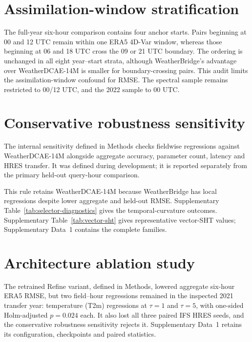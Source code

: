 \documentclass[referee,pdflatex,sn-nature]{sn-jnl}
\begin{document}
\FloatBarrier
\section{Assimilation-window stratification}

The full-year six-hour comparison contains four anchor starts. Pairs beginning
at 00 and 12 UTC remain within one ERA5 4D-Var window, whereas those beginning
at 06 and 18 UTC cross the 09 or 21 UTC boundary. The ordering is unchanged in
all eight year--start strata, although WeatherBridge's advantage over
WeatherDCAE-14M is smaller for boundary-crossing pairs. This audit limits the
assimilation-window confound for RMSE. The spectral sample remains restricted
to 00/12 UTC, and the 2022 sample to 00 UTC.



\FloatBarrier
\section{Conservative robustness sensitivity}

The internal sensitivity defined in Methods checks fieldwise regressions
against WeatherDCAE-14M alongside aggregate accuracy, parameter count,
latency and HRES transfer. It was defined during development; it is
reported separately from the primary held-out query-hour comparison.

This rule retains WeatherDCAE-14M because WeatherBridge has local regressions
despite lower aggregate and held-out RMSE. Supplementary
Table~\ref{tab:selector-diagnostics} gives the temporal-curvature
outcomes. Supplementary Table~\ref{tab:vector-sht} gives representative
vector-SHT values; Supplementary Data~1 contains the complete families.





\FloatBarrier
\section{Architecture ablation study}



The retrained Refine variant, defined in Methods, lowered aggregate six-hour
ERA5 RMSE, but two field--hour regressions remained in the inspected 2021
transfer year: temperature (T2m) regressions at $\tau=1$ and $\tau=5$, with
one-sided Holm-adjusted $p=0.024$ each. It also lost all three paired IFS HRES
seeds, and the conservative robustness sensitivity rejects it.
Supplementary Data~1 retains its configuration, checkpoints and paired
statistics.
\end{document}
